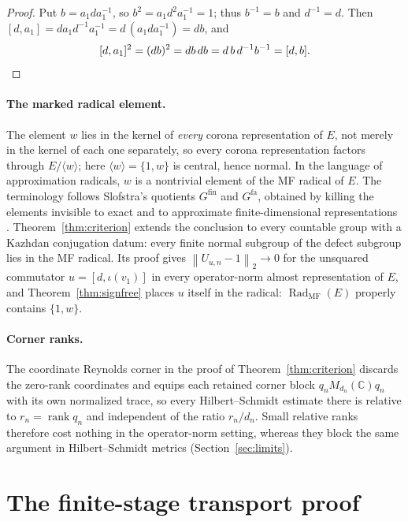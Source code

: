 \documentclass[11pt]{amsart}
\theoremstyle{definition}
\theoremstyle{remark}
\theoremstyle{plain}
\newcommand{\C}{\mathbb C}
\newcommand{\hsnorm}[1]{\left\lVert #1\right\rVert_{2}}
\begin{document}
\begin{proof}
Put $b=a_1da_1^{-1}$, so $b^2=a_1d^2a_1^{-1}=1$; thus $b^{-1}=b$ and
$d^{-1}=d$.  Then $[d,a_1]=da_1d^{-1}a_1^{-1}=d\,(a_1da_1^{-1})=db$,
and
\[
  [d,a_1]^2=(db)^2=db\,db=d\,b\,d^{-1}b^{-1}=[d,b] . \qedhere
\]
\end{proof}

\paragraph{The marked radical element.}
The element $w$ lies in the kernel of \emph{every} corona
representation of $E$, not merely in the kernel of each one
separately, so every corona representation factors through
$E/\langle w\rangle$; here $\langle w\rangle=\{1,w\}$ is central, hence
normal.  In the language of approximation radicals, $w$ is a
nontrivial element of the MF radical of $E$.  The terminology follows
Slofstra's quotients $G^{\mathrm{fin}}$ and $G^{\mathrm{fa}}$, obtained
by killing the elements invisible to exact and to approximate
finite-dimensional representations
\cite[Definitions~2.5--2.7]{SlofstraCorrelations}.
Theorem~\ref{thm:criterion} extends the conclusion to every countable
group with a Kazhdan conjugation datum: every finite normal subgroup of
the defect subgroup lies in the MF radical.  Its proof gives
$\hsnorm{U_{u,n}-1}\to0$ for the unsquared commutator
$u=[d,\iota(v_1)]$ in every operator-norm almost representation of $E$,
and Theorem~\ref{thm:signfree} places $u$ itself in the radical:
$\operatorname{Rad}_{\mathrm{MF}}(E)$ properly contains $\{1,w\}$.

\paragraph{Corner ranks.}
The coordinate Reynolds corner in the proof of
Theorem~\ref{thm:criterion} discards the zero-rank coordinates and
equips each retained corner block $q_nM_{d_n}(\C)q_n$ with its own
normalized trace, so every Hilbert--Schmidt estimate there is relative
to $r_n=\operatorname{rank}q_n$ and independent of the ratio
$r_n/d_n$.  Small relative ranks therefore cost nothing in the
operator-norm setting, whereas they block the same argument in
Hilbert--Schmidt metrics (Section~\ref{sec:limits}).
\section{The finite-stage transport proof}\label{app:finite-stage}
\end{document}
